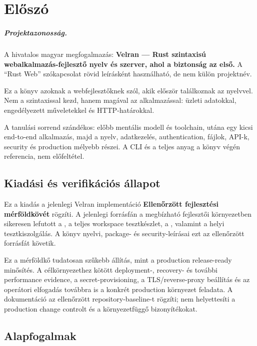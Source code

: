 \chapter*{Előszó}

\paragraph{Projektazonosság.} A hivatalos magyar megfogalmazás: \textbf{Velran --- Rust szintaxisú webalkalmazás-fejlesztő nyelv és szerver, ahol a biztonság az első.} A ``Rust Web'' szókapcsolat rövid leírásként használható, de nem külön projektnév.


Ez a könyv azoknak a webfejlesztőknek szól, akik először találkoznak az \velran{} nyelvvel. Nem a szintaxissal kezd, hanem magával az alkalmazással: üzleti adatokkal, engedélyezett műveletekkel és HTTP-határokkal.

A tanulási sorrend szándékos: előbb mentális modell és toolchain, utána egy kicsi end-to-end alkalmazás, majd a nyelv, adatkezelés, authentication, fájlok, API-k, security és production mélyebb részei. A CLI és a teljes  anyag a könyv végén referencia, nem előfeltétel.


\section*{Kiadási és verifikációs állapot}

Ez a kiadás a jelenlegi Velran implementáció \textbf{Ellenőrzött fejlesztési mérföldkövét} rögzíti. A jelenlegi forrásfán a megbízható fejlesztői környezetben sikeresen lefutott a , a teljes workspace tesztkészlet, a , valamint a helyi tesztkiszolgálás. A könyv nyelvi, package- és security-leírásai ezt az ellenőrzött forrásfát követik.

Ez a mérföldkő tudatosan szűkebb állítás, mint a production release-ready minősítés. A célkörnyezethez kötött deployment-, recovery- és további performance evidence, a secret-provisioning, a TLS/reverse-proxy beállítás és az operátori elfogadás továbbra is a konkrét production környezet feladata. A dokumentáció az ellenőrzött repository-baseline-t rögzíti; nem helyettesíti a production change controlt és a környezetfüggő bizonyítékokat.

\section*{Alapfogalmak}

